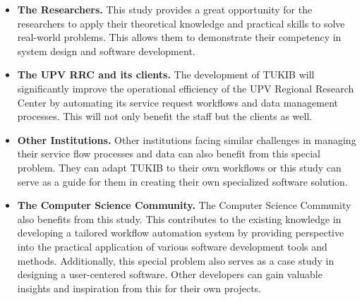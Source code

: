 \begin{itemize}
	
\item \textbf{The Researchers.}
This study provides a great opportunity for the researchers to apply their theoretical knowledge and practical skills to solve real-world problems. This allows them to demonstrate their competency in system design and software development. 

\item \textbf{The UPV RRC and its clients.}
The development of TUKIB will significantly improve the operational efficiency of the UPV Regional Research Center by automating its service request workflows and data management processes. This will not only benefit the staff but the clients as well.

\item \textbf{Other Institutions.}
Other institutions facing similar challenges in managing their service flow processes and data can also benefit from this special problem. They can adapt TUKIB to their own workflows or this study can serve as a guide for them in creating their own specialized software solution. 

\item \textbf{The Computer Science Community.}
The Computer Science Community also benefits from this study. This contributes to the existing knowledge in developing a tailored workflow automation system by providing perspective into the practical application of various software development tools and  methods. Additionally, this special problem also serves as a case study in designing  a user-centered software. Other developers can gain valuable insights and inspiration from this for their own projects.

\end {itemize}

